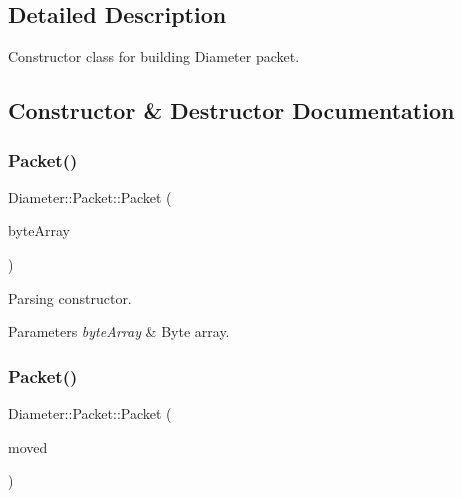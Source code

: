 \subsection{Detailed Description}
Constructor class for building Diameter packet. 

\subsection{Constructor \& Destructor Documentation}
\mbox{\label{classDiameter_1_1Packet_a6d064316d887b5c9b99b6acfd2e2e54c}} 
\subsubsection{\texorpdfstring{Packet()}{Packet()}\hspace{0.1cm}{\footnotesize\ttfamily [1/3]}}
{\footnotesize\ttfamily Diameter\+::\+Packet\+::\+Packet (\begin{DoxyParamCaption}\item[{const Byte\+Array \&}]{byte\+Array }\end{DoxyParamCaption})\hspace{0.3cm}{\ttfamily [explicit]}}



Parsing constructor. 


\begin{DoxyParams}{Parameters}
{\em byte\+Array} & Byte array. \\
\hline
\end{DoxyParams}
\mbox{\label{classDiameter_1_1Packet_a2bab0abbaf390210f24b0e4f9a10f58a}} 
\subsubsection{\texorpdfstring{Packet()}{Packet()}\hspace{0.1cm}{\footnotesize\ttfamily [2/3]}}
{\footnotesize\ttfamily Diameter\+::\+Packet\+::\+Packet (\begin{DoxyParamCaption}\item[{\hyperlink{classDiameter_1_1Packet}{Diameter\+::\+Packet} \&\&}]{moved }\end{DoxyParamCaption})\hspace{0.3cm}{\ttfamily [noexcept]}}



